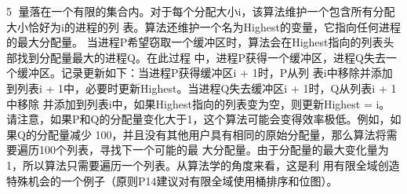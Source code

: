                                                  5
量落在一个有限的集合内。对于每个分配大小i，该算法维护一个包含所有分配大小恰好为i的进程的列
表。算法还维护一个名为Highest的变量，它指向任何进程的最大分配量。
当进程P希望窃取一个缓冲区时，算法会在Highest指向的列表头部找到分配量最大的进程Q。在此过程
中，进程P获得一个缓冲区，进程Q失去一个缓冲区。记录更新如下：当进程P获得缓冲区i + 1时，P从列
表i中移除并添加到列表i + 1中，必要时更新Highest。当进程Q失去缓冲区i + 1时，Q从列表i + 1中移除
并添加到列表i中，如果Highest指向的列表变为空，则更新Highest = i。
请注意，如果P和Q的分配量变化大于1，这个算法可能会变得效率极低。例如，如果Q的分配量减少
100，并且没有其他用户具有相同的原始分配量，那么算法将需要遍历100个列表，寻找下一个可能的最
大分配量。由于分配量的最大变化量为1，所以算法只需要遍历一个列表。从算法学的角度来看，这是利
用有限全域创造特殊机会的一个例子（原则P14建议对有限全域使用桶排序和位图）。




